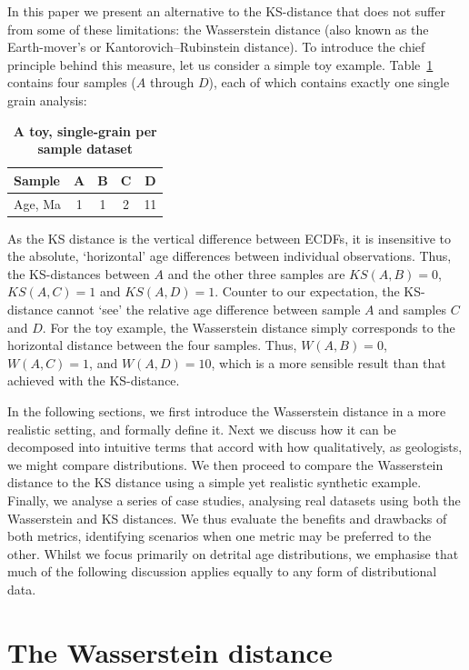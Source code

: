 \documentclass[gchron, manuscript]{copernicus}
\begin{document}
In this paper we present an alternative to the KS-distance that does not suffer from some of these limitations: the Wasserstein distance (also known as the Earth-mover's  or Kantorovich–Rubinstein distance). To introduce the chief principle behind this measure, let us consider a simple toy example. Table~\ref{tab:toy_samples} contains four samples ($A$ through $D$), each of which contains exactly one single grain analysis:
\begin{table}[!ht]
\centering
\caption{\textbf{A toy, single-grain per sample dataset}}
\begin{tabular}{l|cccc}
Sample & A & B & C & D  \\ \hline
Age, Ma & 1 & 1 & 2 & 11 \\
\end{tabular}
\label{tab:toy_samples}
\end{table}

As the KS distance is the vertical difference between ECDFs, it is insensitive to the absolute, `horizontal' age differences between individual observations. Thus, the KS-distances between $A$ and the other three samples are $KS(A,B) = 0$, $KS(A,C) = 1$ and $KS(A,D) = 1$. Counter to our expectation, the KS-distance cannot `see' the relative age difference between sample $A$ and samples $C$ and $D$. For the toy example, the Wasserstein distance simply corresponds to the horizontal distance between the four samples. Thus, $W(A,B) = 0$, $W(A,C) = 1$, and $W(A,D) = 10$, which is a more sensible result than that achieved with the KS-distance.

In the following sections, we first introduce the Wasserstein distance in a more realistic setting, and formally define it. Next we discuss how it can be decomposed into intuitive terms that accord with how qualitatively, as geologists, we might compare distributions. We then proceed to compare the Wasserstein distance to the KS distance using a simple yet realistic synthetic example. Finally, we analyse a series of case studies, analysing real datasets using both the Wasserstein and KS distances. We thus evaluate the benefits and drawbacks of both metrics, identifying scenarios when one metric may be preferred to the other. Whilst we focus primarily on detrital age distributions, we emphasise that much of the following discussion applies equally to any form of distributional data. 


\section{The Wasserstein distance}
\end{document}
